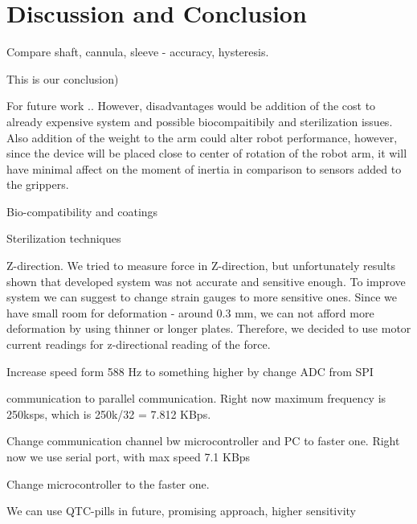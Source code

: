 \chapter{Discussion and Conclusion}
\label{discuss} %

Compare shaft, cannula, sleeve - accuracy, hysteresis.

This is our conclusion)

For future work ..
However, disadvantages would be addition of the cost to already expensive system and possible biocompaitibily and sterilization issues. Also addition of the weight to the arm could alter robot performance, however, since the device will be placed close to center of rotation of the robot arm, it will have minimal affect on the moment of inertia  in comparison to sensors added to the grippers.

Bio-compatibility and coatings

Sterilization techniques

Z-direction. We tried to measure force in Z-direction, but unfortunately results shown that developed system was not accurate and sensitive enough. To improve system we can suggest to change strain gauges to more sensitive ones. Since we have small room for deformation - around 0.3 mm, we can not afford more deformation by using thinner or longer plates. Therefore, we decided to use motor current readings for z-directional reading of the force.

Increase speed form 588 Hz to something higher by change ADC from SPI 

communication to parallel communication. Right now maximum frequency is 
250ksps, which is 250k/32 = 7.812 KBps.

 Change communication channel bw microcontroller and PC to faster one. Right 
 now we use serial port, with max speed 7.1 KBps 
 
Change microcontroller to the faster one. 

We can use QTC-pills in future, promising approach, higher sensitivity 